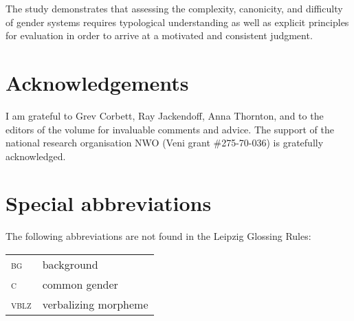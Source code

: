 \documentclass[output=collectionpaper]{langsci/langscibook}
\begin{document}
The study demonstrates that assessing the complexity, canonicity, and difficulty of gender systems requires typological understanding as well as explicit principles for evaluation in order to arrive at a motivated and consistent judgment.

\section*{Acknowledgements}

I am grateful to Grev Corbett, Ray Jackendoff, Anna Thornton, and to the editors of the volume for invaluable comments and advice. The support of the  national research organisation NWO (Veni grant \#275-70-036) is gratefully acknowledged.

\section*{Special abbreviations}

\noindent The following abbreviations are not found in the Leipzig Glossing Rules:
\medskip

\begin{tabular}{ll}
\textsc{bg} & background \\
\textsc{c} & common gender \\
\textsc{vblz} & verbalizing morpheme \\
\end{tabular}


\printbibliography[heading=subbibliography,notkeyword=this]
\end{document}
